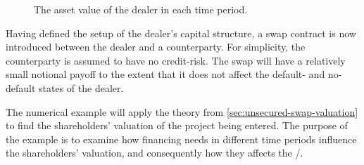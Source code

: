 \documentclass[main.tex]{subfiles}
\begin{document}
        \begin{figure}[H]
            \centering
            \caption{The asset value of the dealer in each time period.}
            \label{fig:example-asset-value-multi-period-dealer}
        \end{figure}

        Having defined the setup of the dealer's capital structure,
        a swap contract is now introduced between the dealer and a counterparty.
        For simplicity, the counterparty is assumed to have no credit-risk.
        The swap will have a relatively small notional payoff to the extent
        that it does not affect the default- and no-default states of the dealer.

        The numerical example will apply the theory from \cref{sec:unsecured-swap-valuation}
        to find the shareholders' valuation of the project being entered.
        The purpose of the example is to examine how financing needs
        in different time periods influence the shareholders' valuation,
        and consequently how they affects the \FVA/.
\end{document}
